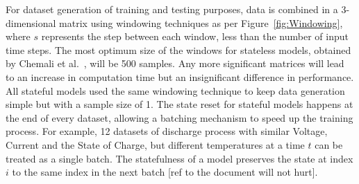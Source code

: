 %
%
For dataset generation of training and testing purposes, data is combined in a 3-dimensional matrix using windowing techniques as per Figure~\ref{fig:Windowing}, where $s$ represents the step between each window, less than the number of input time steps.
The most optimum size of the windows for stateless models, obtained by Chemali et al.~\cite{Chemali2017}, will be 500 samples.
Any more significant matrices will lead to an increase in computation time but an insignificant difference in performance.
All stateful models used the same windowing technique to keep data generation simple but with a sample size of 1.
The state reset for stateful models happens at the end of every dataset, allowing a batching mechanism to speed up the training process.
For example, 12 datasets of discharge process with similar Voltage, Current and the State of Charge, but different temperatures at a time $t$ can be treated as a single batch.
The statefulness of a model preserves the state at index $i$ to the same index in the next batch [ref to the document will not hurt].

